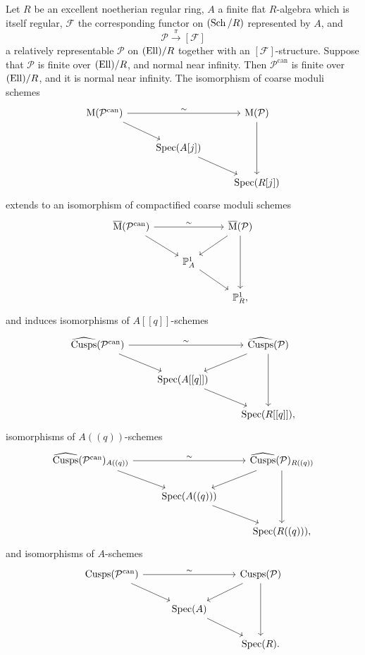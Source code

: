 \begin{kprop}\label{prop:9.3.1}
Let $R$ be an excellent noetherian regular ring, $A$ a finite flat $R$-algebra which is itself regular, $\mathcal{F}$ the corresponding functor on $(\operatorname{Sch}/R)$ represented by $A$, and
\[
\mathcal{P} \xrightarrow{\ \pi\ } [\mathcal{F}]
\]
a relatively representable $\mathcal{P}$ on $(\mathrm{Ell})/R$ together with an $[\mathcal{F}]$-structure. Suppose that $\mathcal{P}$ is finite over $(\mathrm{Ell})/R$, and normal near infinity. Then $\mathcal{P}^{\mathrm{can}}$ is finite over $(\mathrm{Ell})/R$, and it is normal near infinity. The isomorphism of coarse moduli schemes
\[
\begin{tikzcd}[row sep=1.8em, column sep=2.5em]
\Mcoarse(\mathcal{P}^{\mathrm{can}}) \arrow[rr, "\sim"] \arrow[rd] & & \Mcoarse(\mathcal{P}) \arrow[dd] \\
& \Spec(A[j]) \arrow[rd] & \\
& & \Spec(R[j])
\end{tikzcd}
\]
extends to an isomorphism of compactified coarse moduli schemes
\[
\begin{tikzcd}[row sep=1.8em, column sep=2.5em]
\overline{\Mcoarse}(\mathcal{P}^{\mathrm{can}}) \arrow[rr, "\sim"] \arrow[rd] & & \overline{\Mcoarse}(\mathcal{P}) \arrow[ld] \arrow[dd] \\
& \PP^1_A \arrow[rd] & \\
& & \PP^1_R ,
\end{tikzcd}
\]
and induces isomorphisms of $A[[q]]$-schemes
\[
\begin{tikzcd}[row sep=1.8em, column sep=2.5em]
\widehat{\mathrm{Cusps}}(\mathcal{P}^{\mathrm{can}}) \arrow[rr, "\sim"] \arrow[rd] & & \widehat{\mathrm{Cusps}}(\mathcal{P}) \arrow[ld] \arrow[dd] \\
& \Spec(A[[q]]) \arrow[rd] & \\
& & \Spec(R[[q]]) ,
\end{tikzcd}
\]
isomorphisms of $A((q))$-schemes
\[
\begin{tikzcd}[row sep=1.8em, column sep=2.5em]
\widehat{\mathrm{Cusps}}(\mathcal{P}^{\mathrm{can}})_{A((q))} \arrow[rr, "\sim"] \arrow[rd] & & \widehat{\mathrm{Cusps}}(\mathcal{P})_{R((q))} \arrow[ld] \arrow[dd] \\
& \Spec(A((q))) \arrow[rd] & \\
& & \Spec(R((q))) ,
\end{tikzcd}
\]
and isomorphisms of $A$-schemes
\[
\begin{tikzcd}[row sep=1.8em, column sep=2.5em]
\mathrm{Cusps}(\mathcal{P}^{\mathrm{can}}) \arrow[rr, "\sim"] \arrow[rd] & & \mathrm{Cusps}(\mathcal{P}) \arrow[ld] \arrow[dd] \\
& \Spec(A) \arrow[rd] & \\
& & \Spec(R) .
\end{tikzcd}
\]
\end{kprop}

